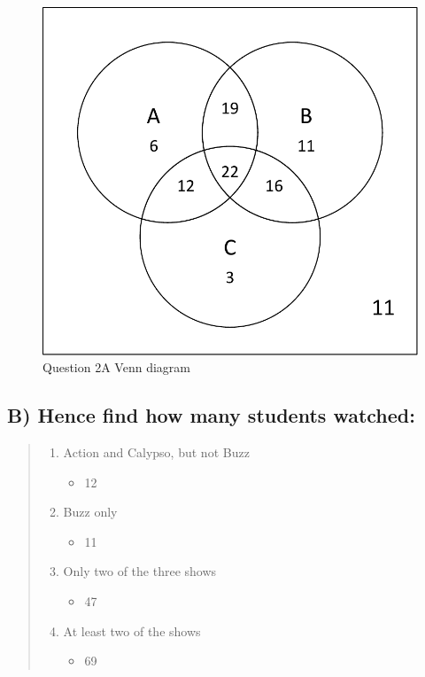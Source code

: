 \documentclass[12pt,a4paper]{article}
\begin{document}
\begin{figure}[h]
\centering
\caption{Question 2A Venn diagram}
\includegraphics[scale=0.5]{./../img/venn_movies.pdf}
\end{figure}

\subsection{B) Hence find how many students watched:}
\begin{quote}
\begin{enumerate}
\item Action and Calypso, but not Buzz
	\begin{itemize}
	\item 12
	\end{itemize}
\item Buzz only
	\begin{itemize}
	\item 11
	\end{itemize}
\item Only two of the three shows
	\begin{itemize}
	\item 47
	\end{itemize}
\item At least two of the shows
	\begin{itemize}
	\item 69
	\end{itemize}
\end{enumerate}
\end{quote}
\end{document}
